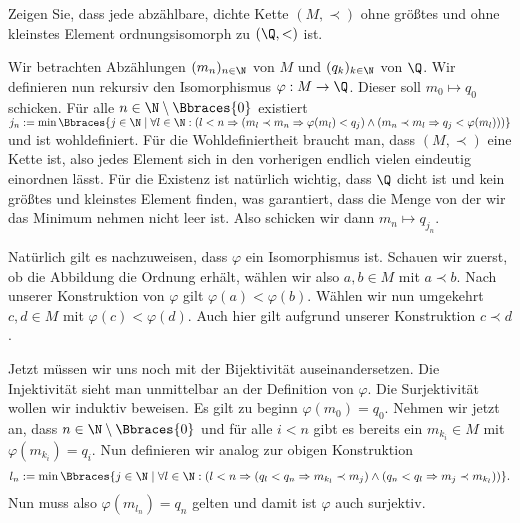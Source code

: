 \begin{exercise}
    Zeigen Sie, dass jede abzählbare, dichte Kette $(M, \prec)$ ohne größtes und ohne kleinstes Element ordnungsisomorph zu $(\Q, <)$ ist.
\end{exercise}
\begin{solution}
    Wir betrachten Abzählungen $(m_n)_{n \in \N}$ von $M$ und $(q_k)_{k \in \N}$ von $\Q$. Wir definieren nun rekursiv den Isomorphismus $\varphi: M \to \Q$. Dieser soll $m_0 \mapsto q_0$ schicken. Für alle $n \in \N \setminus \Bbraces{0}$ existiert $j_n := \min\Bbraces{j \in \N \mid \forall l \in \N: (l < n \Rightarrow (m_l \prec m_n \Rightarrow \varphi(m_l) < q_j) \land (m_n \prec m_l \Rightarrow q_j < \varphi(m_l) ) )}$ und ist wohldefiniert. Für die Wohldefiniertheit braucht man, dass $(M, \prec)$ eine Kette ist, also jedes Element sich in den vorherigen endlich vielen eindeutig einordnen lässt. Für die Existenz ist natürlich wichtig, dass $\Q$ dicht ist und kein größtes und kleinstes Element finden, was garantiert, dass die Menge von der wir das Minimum nehmen nicht leer ist. Also schicken wir dann $m_n \mapsto q_{j_n}$.
    
    Natürlich gilt es nachzuweisen, dass $\varphi$ ein Isomorphismus ist. Schauen wir zuerst, ob die Abbildung die Ordnung erhält, wählen wir also $a,b \in M$ mit $a \prec b$. Nach unserer Konstruktion von $\varphi$ gilt $\varphi(a) < \varphi(b)$. Wählen wir nun umgekehrt $c,d \in M$ mit $\varphi(c) < \varphi(d)$. Auch hier gilt aufgrund unserer Konstruktion $c \prec d$. 

    Jetzt müssen wir uns noch mit der Bijektivität auseinandersetzen. Die Injektivität sieht man unmittelbar an der Definition von $\varphi$. Die Surjektivität wollen wir induktiv beweisen. Es gilt zu beginn $\varphi(m_0) = q_0$. Nehmen wir jetzt an, dass $n \in \N \setminus \Bbraces{0}$ und für alle $i < n$ gibt es bereits ein $m_{k_i} \in M$ mit $\varphi(m_{k_i}) = q_i$. Nun definieren wir analog zur obigen Konstruktion
    \begin{align*}
        l_n :=  \min\Bbraces{j \in \N \mid \forall l \in \N: (l < n \Rightarrow (q_l < q_n \Rightarrow m_{k_l} \prec m_j) \land (q_n < q_l \Rightarrow m_j \prec m_{k_l} ) )} .
    \end{align*}
    Nun muss also $\varphi(m_{l_n}) = q_n$ gelten und damit ist $\varphi$ auch surjektiv.
\end{solution}